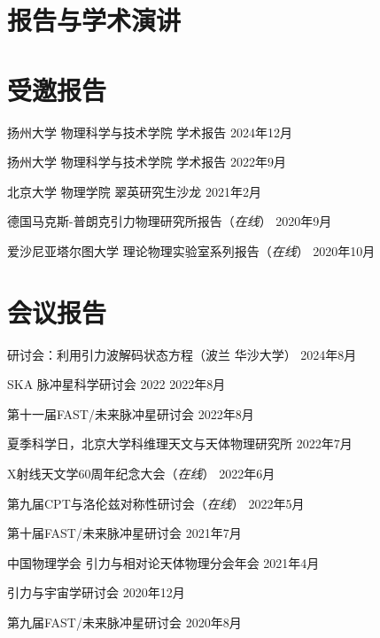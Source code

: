 \documentclass[margin,line]{res_mod}
\begin{document}
\begin{resume}
\section{报告与学术演讲}
\vspace*{.4in}
\newcommand{\playsymbol}{$\blacktriangleright$}
\section{\sc 受邀报告}
\begin{etaremune}
  \item 扬州大学 物理科学与技术学院 学术报告 \hfill{} 2024年12月
  \item 扬州大学 物理科学与技术学院 学术报告 \hfill{} 2022年9月
  \item 北京大学 物理学院 翠英研究生沙龙 \hfill{} 2021年2月
  \item 德国马克斯-普朗克引力物理研究所报告（{\it 在线}） \hfill{} 2020年9月
  \item 爱沙尼亚塔尔图大学 理论物理实验室系列报告（{\it 在线}） \hfill{} 2020年10月
\end{etaremune}

\section{\sc 会议报告}
\begin{etaremune}
  \item 研讨会：利用引力波解码状态方程（波兰 华沙大学） \hfill{} 2024年8月
  \item SKA 脉冲星科学研讨会 2022 \hfill{} 2022年8月
  \item 第十一届FAST/未来脉冲星研讨会\hfill{} 2022年8月
  \item 夏季科学日，北京大学科维理天文与天体物理研究所 \hfill{} 2022年7月
  \item X射线天文学60周年纪念大会（{\it 在线}） \hfill{} 2022年6月
  \item 第九届CPT与洛伦兹对称性研讨会（{\it 在线}） \hfill{} 2022年5月
  \item 第十届FAST/未来脉冲星研讨会  \hfill{} 2021年7月
  \item 中国物理学会 引力与相对论天体物理分会年会 \hfill{} 2021年4月
  \item 引力与宇宙学研讨会 \hfill{} 2020年12月
  \item 第九届FAST/未来脉冲星研讨会 \hfill{} 2020年8月
\end{etaremune}



\newpage{}

\end{resume}
\end{document}
